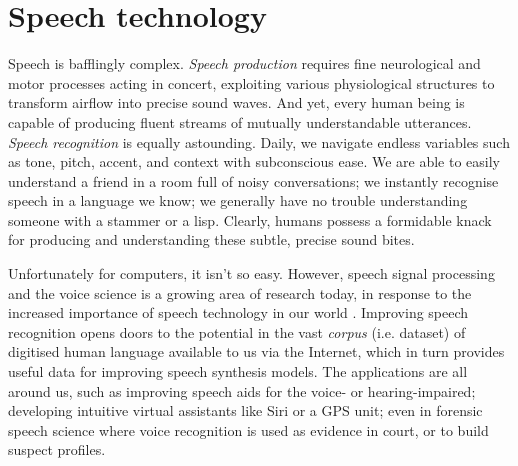 \section{Speech technology}

Speech is bafflingly complex. \textit{Speech production} requires fine neurological and motor processes acting in concert, exploiting various physiological structures to transform airflow into precise sound waves. And yet, every human being is capable of producing fluent streams of mutually understandable utterances. \textit{Speech recognition} is equally astounding. Daily, we navigate endless variables such as tone, pitch, accent, and context with subconscious ease. We are able to easily understand a friend in a room full of noisy conversations; we instantly recognise speech in a language we know; we generally have no trouble understanding someone with a stammer or a lisp. Clearly, humans possess a formidable knack for producing and understanding these subtle, precise sound bites.

Unfortunately for computers, it isn't so easy. However, speech signal processing and the voice science is a growing area of research today, in response to the increased importance of speech technology in our world \cite{syntaxnet}. Improving speech recognition opens doors to the potential in the vast \textit{corpus} (i.e. dataset) of digitised human language available to us via the Internet, which in turn provides useful data for improving speech synthesis models. The applications are all around us, such as improving speech aids for the voice- or hearing-impaired; developing intuitive virtual assistants like Siri or a GPS unit; even in forensic speech science where voice recognition is used as evidence in court, or to build suspect profiles.

